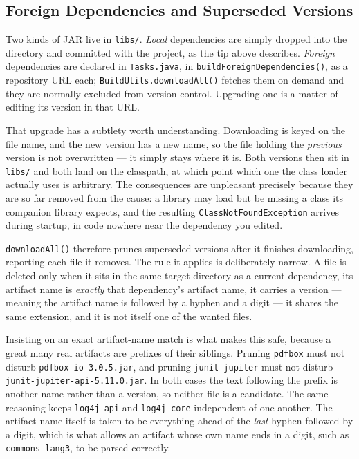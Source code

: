 \subsection{Foreign Dependencies and Superseded Versions}
\label{sec:build-deps-prune}

Two kinds of JAR live in \texttt{libs/}.  \emph{Local} dependencies are simply dropped into the directory and committed with the project, as the tip above describes.  \emph{Foreign} dependencies are declared in \texttt{Tasks.java}, in \texttt{buildForeignDependencies()}, as a repository URL each; \texttt{BuildUtils.downloadAll()} fetches them on demand and they are normally excluded from version control.  Upgrading one is a matter of editing its version in that URL.

That upgrade has a subtlety worth understanding.  Downloading is keyed on the file name, and the new version has a new name, so the file holding the \emph{previous} version is not overwritten --- it simply stays where it is.  Both versions then sit in \texttt{libs/} and both land on the classpath, at which point which one the class loader actually uses is arbitrary.  The consequences are unpleasant precisely because they are so far removed from the cause: a library may load but be missing a class its companion library expects, and the resulting \texttt{ClassNotFoundException} arrives during startup, in code nowhere near the dependency you edited.

\texttt{downloadAll()} therefore prunes superseded versions after it finishes downloading, reporting each file it removes.  The rule it applies is deliberately narrow.  A file is deleted only when it sits in the same target directory as a current dependency, its artifact name is \emph{exactly} that dependency's artifact name, it carries a version --- meaning the artifact name is followed by a hyphen and a digit --- it shares the same extension, and it is not itself one of the wanted files.

Insisting on an exact artifact-name match is what makes this safe, because a great many real artifacts are prefixes of their siblings.  Pruning \texttt{pdfbox} must not disturb \texttt{pdfbox-io-3.0.5.jar}, and pruning \texttt{junit-jupiter} must not disturb \texttt{junit-jupiter-api-5.11.0.jar}.  In both cases the text following the prefix is another name rather than a version, so neither file is a candidate.  The same reasoning keeps \texttt{log4j-api} and \texttt{log4j-core} independent of one another.  The artifact name itself is taken to be everything ahead of the \emph{last} hyphen followed by a digit, which is what allows an artifact whose own name ends in a digit, such as \texttt{commons-lang3}, to be parsed correctly.

